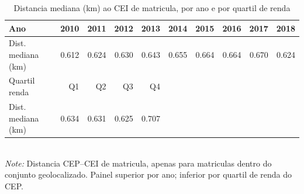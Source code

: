 \begin{table}[htbp]\centering
\caption{Distancia mediana (km) ao CEI de matricula, por ano e por quartil de renda}
\label{tab:T5b_distancia}
\small
\setlength{\tabcolsep}{4pt}
\begin{tabular}{lrrrrrrrrr}
\toprule
Ano & 2010 & 2011 & 2012 & 2013 & 2014 & 2015 & 2016 & 2017 & 2018 \\
\midrule
Dist. mediana (km) & 0.612 & 0.624 & 0.630 & 0.643 & 0.655 & 0.664 & 0.664 & 0.670 & 0.624 \\
\midrule
Quartil renda & Q1 & Q2 & Q3 & Q4 &  &  &  &  &  \\
Dist. mediana (km) & 0.634 & 0.631 & 0.625 & 0.707 &  &  &  &  &  \\
\bottomrule
\end{tabular}
\\[3pt]{\footnotesize \textit{Note:} Distancia CEP--CEI de matricula, apenas para matriculas dentro do conjunto geolocalizado. Painel superior por ano; inferior por quartil de renda do CEP.}
\end{table}

